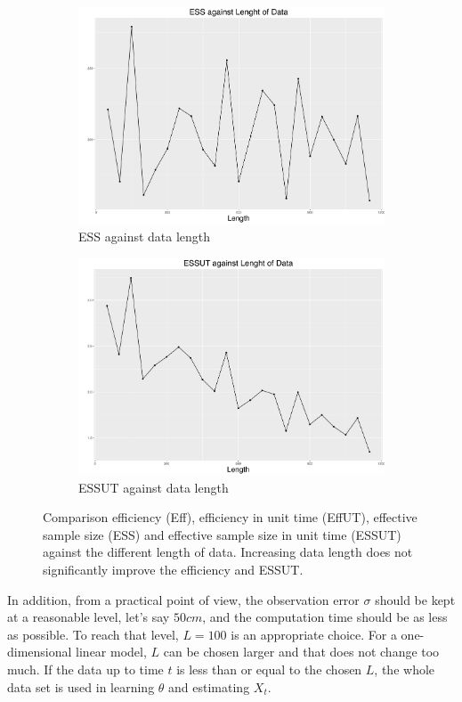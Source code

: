 \begin{figure}[h]
\begin{subfigure}[t]{0.45\textwidth}
    \includegraphics[width=\textwidth]{Chapters/05MCMCOU/plots/simudataOUlengthess.pdf}
    \caption{ESS against data length}
\end{subfigure}
\begin{subfigure}[t]{0.45\textwidth}
    \includegraphics[width=\textwidth]{Chapters/05MCMCOU/plots/simudataOUlengthessut.pdf}
    \caption{ESSUT against data length}
\end{subfigure}
\caption{Comparison efficiency (Eff), efficiency in unit time (EffUT), effective sample size (ESS) and effective sample size in unit time (ESSUT) against the different length of data. Increasing data length does not significantly improve the efficiency and ESSUT.}\label{compareLengthData}
\end{figure}
In addition, from a practical point of view, the observation error $\sigma$ should be kept at a reasonable level, let's say $50cm$, and the computation time should be as less as possible. To reach that level, $L=100$ is an appropriate choice. For a one-dimensional linear model, $L$ can be chosen larger and that does not change too much. If the data up to time $t$ is less than or equal to the chosen $L$, the whole data set is used in learning $\theta$ and estimating $X_t$. 


